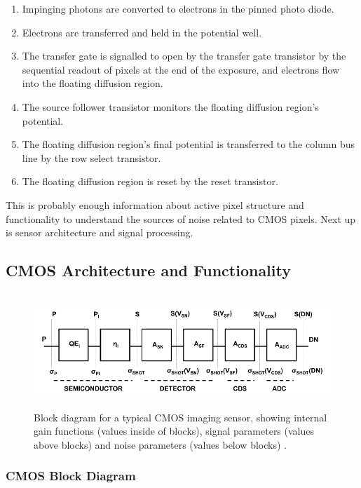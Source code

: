 \documentclass[10pt]{article}
\begin{document}
\begin{enumerate}[noitemsep]
\item Impinging photons are converted to electrons in the pinned photo diode.
\item Electrons are transferred and held in the potential well.
\item The transfer gate is signalled to open by the transfer gate transistor by the sequential readout of pixels at the end of the exposure, and electrons flow into the floating diffusion region.
\item The source follower transistor monitors the floating diffusion region's potential.
\item The floating diffusion region's final potential is transferred to the column bus line by the row select transistor.
\item The floating diffusion region is reset by the reset transistor.
\end{enumerate}

This is probably enough information about active pixel structure and functionality to understand the sources of noise related to CMOS pixels. Next up is sensor architecture and signal processing.

\subsection{CMOS Architecture and Functionality}


\begin{figure}[!b]
    \centering
        \includegraphics[height=1.7in]{CMOS Block Diagram.png}
    \caption{Block diagram for a typical CMOS imaging sensor, showing internal gain functions (values inside of blocks), signal parameters (values above blocks) and noise parameters (values below blocks) \cite{janesick}.}
    \label{fig:FuncSchematic}
\end{figure}

\subsubsection{CMOS Block Diagram}
\label{sec:transdiagram}
\end{document}
